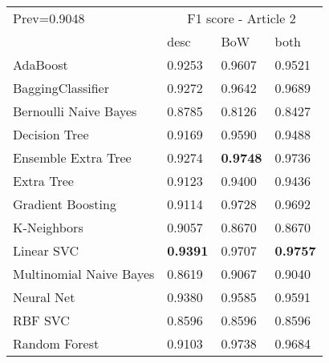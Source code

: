 \begin{tabular}{|l|l|l|l| }
\hline
Prev=0.9048 &  \multicolumn{3}{c|}{F1 score - Article 2} \\
\cline{2-4} & desc & BoW & both \\ \hline
AdaBoost                & 0.9253 & 0.9607 & 0.9521\\
BaggingClassifier       & 0.9272 & 0.9642 & 0.9689\\
Bernoulli Naive Bayes   & 0.8785 & 0.8126 & 0.8427\\
Decision Tree           & 0.9169 & 0.9590 & 0.9488\\
Ensemble Extra Tree     & 0.9274 & {\bf 0.9748} & 0.9736\\
Extra Tree              & 0.9123 & 0.9400 & 0.9436\\
Gradient Boosting       & 0.9114 & 0.9728 & 0.9692\\
K-Neighbors             & 0.9057 & 0.8670 & 0.8670\\
Linear SVC              & {\bf 0.9391} & 0.9707 & {\bf 0.9757}\\
Multinomial Naive Bayes & 0.8619 & 0.9067 & 0.9040\\
Neural Net              & 0.9380 & 0.9585 & 0.9591\\
RBF SVC                 & 0.8596 & 0.8596 & 0.8596\\
Random Forest           & 0.9103 & 0.9738 & 0.9684\\
\hline
\end{tabular}
